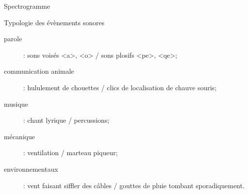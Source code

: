 \begin{frame}{Spectrogramme}
\begin{center}

\end{center}
\end{frame}

\begin{frame}{Typologie des évènements sonores}
\begin{description}
  \item[parole] : sons voisés <a>, <o> / sons plosifs <pe>, <qe>;
  \item[communication animale] : hululement de chouettes / clics de localisation de chauve souris;
  \item[musique] : chant lyrique / percussions;
  \item[mécanique] : ventilation / marteau piqueur;
  \item[environnementaux] : vent faisant siffler des câbles / gouttes de pluie tombant sporadiquement.
\end{description}
\end{frame}

